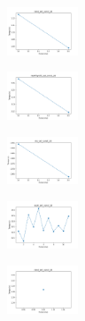\begin{figure}[H]
    \begin{subfigure}
        \centering
        \includegraphics[width=0.234\textwidth]{img/copkm/rand_set_const_20_277451237_time.png}
    \end{subfigure}
    \hfill
    \begin{subfigure}
        \centering
        \includegraphics[width=0.234\textwidth]{img/copkm/newthyroid_set_const_20_277451237_time.png}
    \end{subfigure}
    \hfill
    \begin{subfigure}
        \centering
        \includegraphics[width=0.234\textwidth]{img/copkm/iris_set_const_20_49258669_time.png}
    \end{subfigure}
    \hfill
    \begin{subfigure}
        \centering
        \includegraphics[width=0.234\textwidth]{img/copkm/ecoli_set_const_20_49258669_time.png}
    \end{subfigure}
    \hfill
    \begin{subfigure}
        \centering
        \includegraphics[width=0.234\textwidth]{img/copkm/rand_set_const_20_49258669_time.png}
    \end{subfigure}
    \hfill
    \begin{subfigure}
        \centering

\end{subfigure}
\end{figure}
